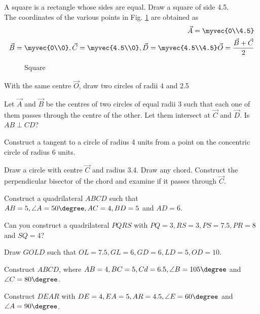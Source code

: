 %
\item A square is a rectangle whose sides are equal.  Draw a square of side 4.5.
\\
\solution The coordinates of the various points in Fig. \ref{fig:square} are obtained as
%
\begin{align}
\vec{A} = \myvec{0\\4.5}
\\
\vec{B} = \myvec{0\\0},
\vec{C} = \myvec{4.5\\0},
\vec{D} = \myvec{4.5\\4.5}
\vec{O} = \frac{\vec{B}+\vec{C}}{2}
%
\end{align}
%
\begin{figure}[!ht]
	\begin{center}
		\resizebox{\columnwidth}{!}{}
	\end{center}
	\caption{Square}
	\label{fig:square}	
\end{figure}
\item With the same centre $\vec{O}$,  draw two circles of radii 4 and 2.5
\\
\solution

\item Let $\vec{A}$ and $\vec{B}$ be the centres of two circles of equal radii 3 such that each one of them passes through the centre of the other.  Let them intersect at $\vec{C}$ and $\vec{D}$.  Is $AB \perp CD$?
\\
\solution


\item Construct a tangent to a circle of radius 4 units from a point on the concentric circle of radius 6 
units.
\\
\solution 

\item Draw a circle with centre $\vec{C}$ and radius 3.4.  Draw any chord.  Construct the perpendicular bisector of the chord and examine if it passes through $\vec{C}$.
\\
\solution

\item Construct a quadrilateral $ABCD$ such that $AB=5, \angle A = 50\degree, AC = 4, BD = 5$ and $AD = 6$.
\\
\solution 

\item Can you construct a quadrilateral $PQRS$ with $PQ=3, RS=3, PS=7.5, PR=8$ and $SQ=4$?
\\
\solution 

\item Draw $GOLD$ such that $OL=7.5, GL=6, GD=6, LD = 5, OD = 10$.
\\
\solution 

\item Construct $ABCD $, where $AB = 4, BC = 5, Cd = 6.5, \angle B = 105 \degree$ and $\angle C = 80\degree$.
\\
\solution 

%
\item Construct $DEAR$ with $DE = 4, EA = 5, AR = 4.5, \angle E = 60 \degree$ and $\angle A = 90 \degree$.
\\
\solution 


